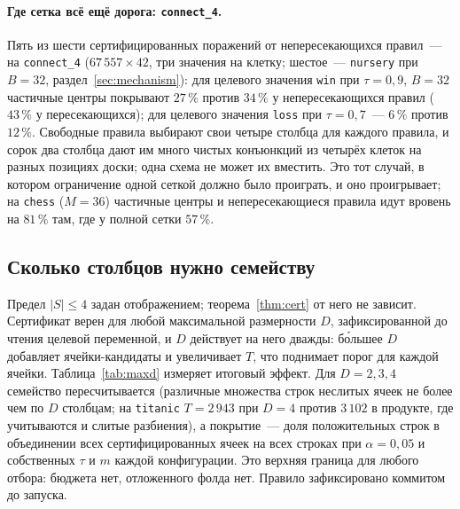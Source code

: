 \documentclass[11pt]{article}
\begin{document}
\paragraph{Где сетка всё ещё дорога: \texttt{connect\_4}.} Пять из шести сертифицированных поражений от непересекающихся правил~--- на \texttt{connect\_4} ($67\,557\times42$, три значения на клетку; шестое~--- \texttt{nursery} при $B=32$, раздел~\ref{sec:mechanism}): для целевого значения \texttt{win} при $\tau=0{,}9$, $B=32$ частичные центры покрывают $27\,\%$ против $34\,\%$ у непересекающихся правил ($43\,\%$ у пересекающихся); для целевого значения \texttt{loss} при $\tau=0{,}7$~--- $6\,\%$ против $12\,\%$. Свободные правила выбирают свои четыре столбца для каждого правила, и сорок два столбца дают им много чистых конъюнкций из четырёх клеток на разных позициях доски; одна схема не может их вместить. Это тот случай, в котором ограничение одной сеткой должно было проиграть, и оно проигрывает; на \texttt{chess} ($M=36$) частичные центры и непересекающиеся правила идут вровень на $81\,\%$ там, где у полной сетки $57\,\%$.

\subsection{Сколько столбцов нужно семейству}\label{sec:maxd}
Предел $|S|\le4$ задан отображением; теорема~\ref{thm:cert} от него не зависит. Сертификат верен для любой максимальной размерности $D$, зафиксированной до чтения целевой переменной, и $D$ действует на него дважды: бо́льшее $D$ добавляет ячейки-кандидаты и увеличивает $T$, что поднимает порог для каждой ячейки. Таблица~\ref{tab:maxd} измеряет итоговый эффект. Для $D=2,3,4$ семейство пересчитывается (различные множества строк неслитых ячеек не более чем по $D$ столбцам; на \texttt{titanic} $T=2\,943$ при $D=4$ против $3\,102$ в продукте, где учитываются и слитые разбиения), а покрытие~--- доля положительных строк в объединении всех сертифицированных ячеек на всех строках при $\alpha=0{,}05$ и собственных $\tau$ и $m$ каждой конфигурации. Это верхняя граница для любого отбора: бюджета нет, отложенного фолда нет. Правило зафиксировано коммитом до запуска.
\end{document}
